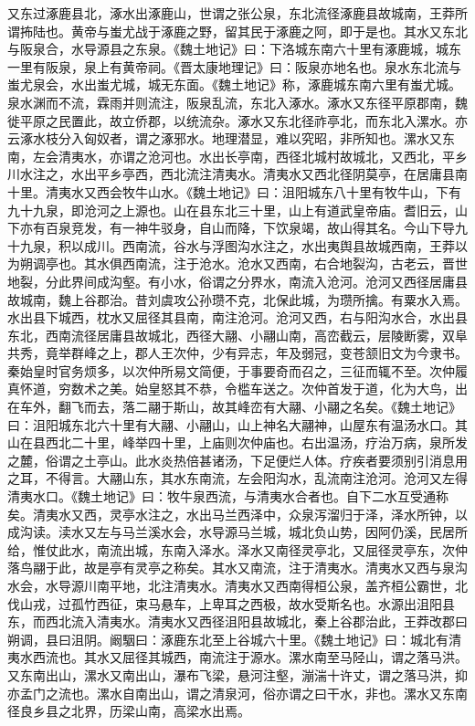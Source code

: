 \documentclass[12pt,UTF8]{ctexbook}
\begin{document}
又东过涿鹿县北，涿水出涿鹿山，世谓之张公泉，东北流径涿鹿县故城南，王莽所谓抪陆也。黄帝与蚩尤战于涿鹿之野，留其民于涿鹿之阿，即于是也。其水又东北与阪泉合，水导源县之东泉。《魏土地记》曰：下洛城东南六十里有涿鹿城，城东一里有阪泉，泉上有黄帝祠。《晋太康地理记》曰：阪泉亦地名也。泉水东北流与蚩尤泉会，水出蚩尤城，城无东面。《魏土地记》称，涿鹿城东南六里有蚩尤城。泉水渊而不流，霖雨并则流注，阪泉乱流，东北入涿水。涿水又东径平原郡南，魏徙平原之民置此，故立侨郡，以统流杂。涿水又东北径祚亭北，而东北入漯水。亦云涿水枝分入匈奴者，谓之涿邪水。地理潜显，难以究昭，非所知也。漯水又东南，左会清夷水，亦谓之沧河也。水出长亭南，西径北城村故城北，又西北，平乡川水注之，水出平乡亭西，西北流注清夷水。清夷水又西北径阴莫亭，在居庸县南十里。清夷水又西会牧牛山水。《魏土地记》曰：沮阳城东八十里有牧牛山，下有九十九泉，即沧河之上源也。山在县东北三十里，山上有道武皇帝庙。耆旧云，山下亦有百泉竞发，有一神牛驳身，自山而降，下饮泉竭，故山得其名。今山下导九十九泉，积以成川。西南流，谷水与浮图沟水注之，水出夷舆县故城西南，王莽以为朔调亭也。其水俱西南流，注于沧水。沧水又西南，右合地裂沟，古老云，晋世地裂，分此界间成沟壑。有小水，俗谓之分界水，南流入沧河。沧河又西径居庸县故城南，魏上谷郡治。昔刘虞攻公孙瓒不克，北保此城，为瓒所擒。有粟水入焉。水出县下城西，枕水又屈径其县南，南注沧河。沧河又西，右与阳沟水合，水出县东北，西南流径居庸县故城北，西径大翮、小翮山南，高峦截云，层陵断雾，双阜共秀，竟举群峰之上，郡人王次仲，少有异志，年及弱冠，变苍颔旧文为今隶书。秦始皇时官务烦多，以次仲所易文简便，于事要奇而召之，三征而辄不至。次仲履真怀道，穷数术之美。始皇怒其不恭，令槛车送之。次仲首发于道，化为大鸟，出在车外，翻飞而去，落二翮于斯山，故其峰峦有大翮、小翮之名矣。《魏土地记》曰：沮阳城东北六十里有大翮、小翮山，山上神名大翮神，山屋东有温汤水口。其山在县西北二十里，峰举四十里，上庙则次仲庙也。右出温汤，疗治万病，泉所发之麓，俗谓之土亭山。此水炎热倍甚诸汤，下足便烂人体。疗疾者要须别引消息用之耳，不得言。大翮山东，其水东南流，左会阳沟水，乱流南注沧河。沧河又左得清夷水口。《魏土地记》曰：牧牛泉西流，与清夷水合者也。自下二水互受通称矣。清夷水又西，灵亭水注之，水出马兰西泽中，众泉泻溜归于泽，泽水所钟，以成沟读。渎水又左与马兰溪水会，水导源马兰城，城北负山势，因阿仍溪，民居所给，惟仗此水，南流出城，东南入泽水。泽水又南径灵亭北，又屈径灵亭东，次仲落鸟翮于此，故是亭有灵亭之称矣。其水又南流，注于清夷水。清夷水又西与泉沟水会，水导源川南平地，北注清夷水。清夷水又西南得桓公泉，盖齐桓公霸世，北伐山戎，过孤竹西征，束马悬车，上卑耳之西极，故水受斯名也。水源出沮阳县东，而西北流入清夷水。清夷水又西径沮阳县故城北，秦上谷郡治此，王莽改郡曰朔调，县曰沮阴。阚駰曰：涿鹿东北至上谷城六十里。《魏土地记》曰：城北有清夷水西流也。其水又屈径其城西，南流注于源水。漯水南至马陉山，谓之落马洪。又东南出山，漯水又南出山，瀑布飞梁，悬河注壑，漰湍十许丈，谓之落马洪，抑亦孟门之流也。漯水自南出山，谓之清泉河，俗亦谓之曰干水，非也。漯水又东南径良乡县之北界，历梁山南，高梁水出焉。
\end{document}
